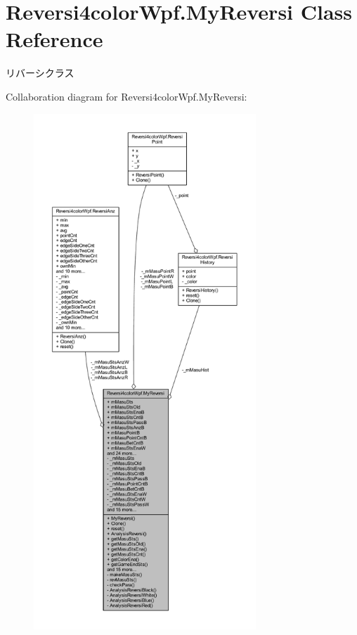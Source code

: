 \hypertarget{class_reversi4color_wpf_1_1_my_reversi}{}\section{Reversi4color\+Wpf.\+My\+Reversi Class Reference}
\label{class_reversi4color_wpf_1_1_my_reversi}


リバーシクラス  




Collaboration diagram for Reversi4color\+Wpf.\+My\+Reversi\+:\nopagebreak
\begin{figure}[H]
\begin{center}
\leavevmode
\includegraphics[height=550pt]{class_reversi4color_wpf_1_1_my_reversi__coll__graph}
\end{center}
\end{figure}
